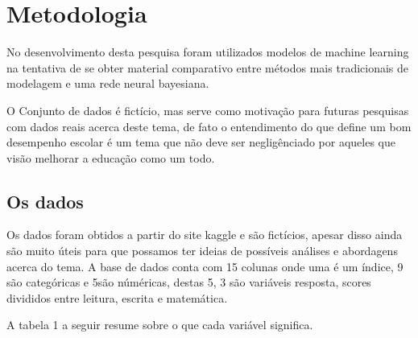 \section{Metodologia}
No desenvolvimento desta pesquisa foram utilizados modelos de machine learning na tentativa de se obter material comparativo entre métodos mais tradicionais de modelagem e uma rede neural bayesiana.

O Conjunto de dados é fictício, mas serve como motivação para futuras pesquisas com dados reais acerca deste tema, de fato o entendimento do que define um bom desempenho escolar é um tema que não deve ser negligênciado por aqueles que visão melhorar a educação como um todo.




\subsection{Os dados}

Os dados foram obtidos a partir do site kaggle\cite{kaggle} e são fictícios, apesar disso ainda são muito úteis para que possamos ter ideias de possíveis análises e abordagens acerca do tema. A base de dados conta com 15 colunas onde uma é um índice, 9 são categóricas e 5são núméricas, destas 5, 3 são variáveis resposta, scores divididos entre leitura, escrita e matemática.

A tabela 1 a seguir resume sobre o que cada variável significa.\\


